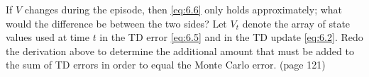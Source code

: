 
\begin{exercise}[Exercise 6.1]

If $V$ changes during the episode, then \eqref{eq:6.6} only holds approximately;
what would the difference be between the two sides?
Let $V_t$ denote the array of state values used at time $t$ in the TD error \eqref{eq:6.5} and in the TD update \eqref{eq:6.2}.
Redo the derivation above to determine the additional amount that must be added to the sum of TD errors in order to equal the Monte Carlo error.
(page 121)

\end{exercise}


